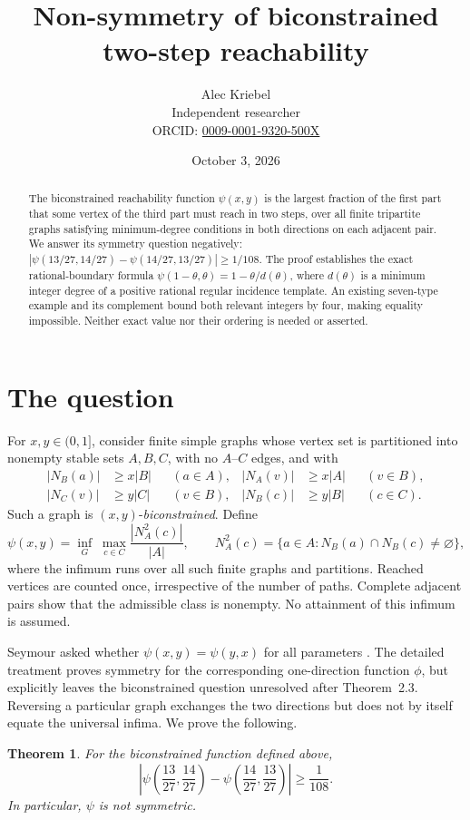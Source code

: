 \documentclass[11pt]{article}
\title{Non-symmetry of biconstrained two-step reachability}
\author{Alec Kriebel\\\small Independent researcher\\
\small ORCID: \href{https://orcid.org/0009-0001-9320-500X}{0009-0001-9320-500X}}
\date{October 3, 2026}
\newtheorem{theorem}{Theorem}
\newcommand{\reach}{N_A^2}
\begin{document}
\maketitle
\begin{abstract}
The biconstrained reachability function $\psi(x,y)$ is the largest
fraction of the first part that some vertex of the third part must
reach in two steps, over all finite tripartite graphs satisfying
minimum-degree conditions in both directions on each adjacent pair.
We answer its symmetry question negatively:
$|\psi(13/27,14/27)-\psi(14/27,13/27)|\geq 1/108$.
The proof establishes the exact rational-boundary formula
$\psi(1-\theta,\theta)=1-\theta/d(\theta)$, where $d(\theta)$ is a
minimum integer degree of a positive rational regular incidence
template. An existing seven-type example and its complement bound
both relevant integers by four, making equality impossible.
Neither exact value nor their ordering is needed or asserted.
\end{abstract}

\section{The question}
For $x,y\in(0,1]$, consider finite simple graphs whose vertex set is
partitioned into nonempty stable sets $A,B,C$, with no $A$--$C$ edges,
and with
\begin{align*}
 |N_B(a)|&\geq x|B| &&(a\in A), &
 |N_A(v)|&\geq x|A| &&(v\in B),\\
 |N_C(v)|&\geq y|C| &&(v\in B), &
 |N_B(c)|&\geq y|B| &&(c\in C).
\end{align*}
Such a graph is $(x,y)$-\emph{biconstrained}. Define
\[
 \psi(x,y)=\inf_G\;\max_{c\in C}\frac{|\reach(c)|}{|A|},
 \qquad
 \reach(c)=\{a\in A:N_B(a)\cap N_B(c)\ne\varnothing\},
\]
where the infimum runs over all such finite graphs and partitions.
Reached vertices are counted once, irrespective of the number of paths.
Complete adjacent pairs show that the admissible class is nonempty.
No attainment of this infimum is assumed.

Seymour asked whether $\psi(x,y)=\psi(y,x)$ for all parameters
\cite[p.~47]{S}. The detailed treatment \cite{CHSSS} proves symmetry
for the corresponding one-direction function $\phi$, but explicitly
leaves the biconstrained question unresolved after Theorem~2.3.
Reversing a particular graph exchanges the two directions but does
not by itself equate the universal infima. We prove the following.

\begin{theorem}\label{main}
For the biconstrained function defined above,
\[
 \left|\psi\left(\frac{13}{27},\frac{14}{27}\right)
       -\psi\left(\frac{14}{27},\frac{13}{27}\right)\right|
 \geq\frac{1}{108}.
\]
In particular, $\psi$ is not symmetric.
\end{theorem}
\end{document}
